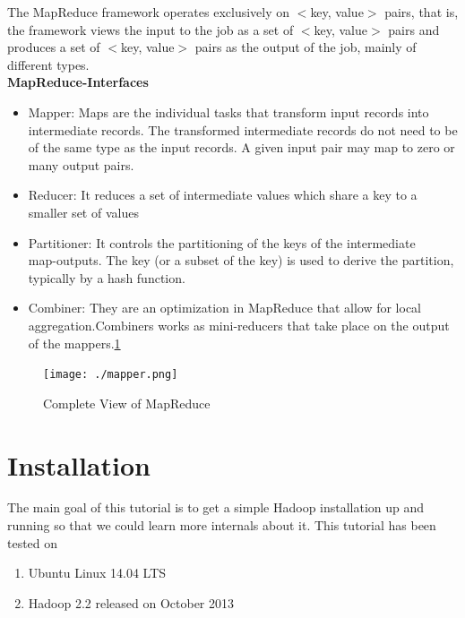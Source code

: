 \documentclass[12pt]{book}
\begin{document}
The MapReduce framework operates exclusively on $<$key, value$>$ pairs, that is, the framework views the input to the
job as a set of $<$key, value$>$ pairs and produces a set of $<$key, value$>$ pairs as the output of the job, 
mainly of different types.\\
\textbf{MapReduce-Interfaces}
\begin{itemize}
 \item Mapper: Maps are the individual tasks that transform input records into \\
 intermediate records. The transformed intermediate records do not need to be of the same type as the input records. 
 A given input pair may map to zero or many output pairs.
 \item Reducer: It reduces a set of intermediate values which share a key to a smaller set of values
 \item Partitioner: It controls the partitioning of the keys of the intermediate \\
 map-outputs. The key (or a subset of the key) is used to derive the partition, typically by a hash function.
 \item Combiner: They are an optimization in MapReduce that allow for local\cite{PNC} \\
 aggregation.Combiners works  as mini-reducers that take place on the output of the mappers.\ref{fig1mapred}
\end{itemize}
\begin{figure}[ht]
 \centering
 \texttt{[image: ./mapper.png]} 
 \caption{Complete View of MapReduce\label{fig1mapred}}
\end{figure}

\section{Installation}
The main goal of this tutorial is to get a simple Hadoop installation up and running so that we could learn more internals about it.
This tutorial has been tested on \cite{single}
\begin{enumerate}
 \item Ubuntu Linux 14.04 LTS
 \item Hadoop 2.2 released on October 2013
\end{enumerate}
\end{document}

